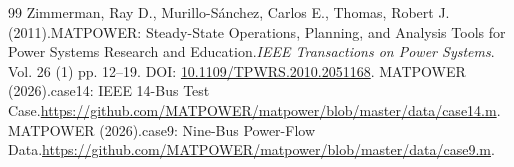 \begin{thebibliography}{99}
Zimmerman, Ray D., Murillo-S{\'a}nchez, Carlos E., Thomas, Robert J. (2011).\newblock MATPOWER: Steady-State Operations, Planning, and Analysis Tools for Power Systems Research and Education.\newblock \emph{IEEE Transactions on Power Systems}. Vol. 26 (1) pp. 12--19. DOI: \href{https://doi.org/10.1109/TPWRS.2010.2051168}{10.1109/TPWRS.2010.2051168}. 
{MATPOWER} (2026).\newblock case14: IEEE 14-Bus Test Case.\newblock \url{https://github.com/MATPOWER/matpower/blob/master/data/case14.m}. 
{MATPOWER} (2026).\newblock case9: Nine-Bus Power-Flow Data.\newblock \url{https://github.com/MATPOWER/matpower/blob/master/data/case9.m}. 
\end{thebibliography}
